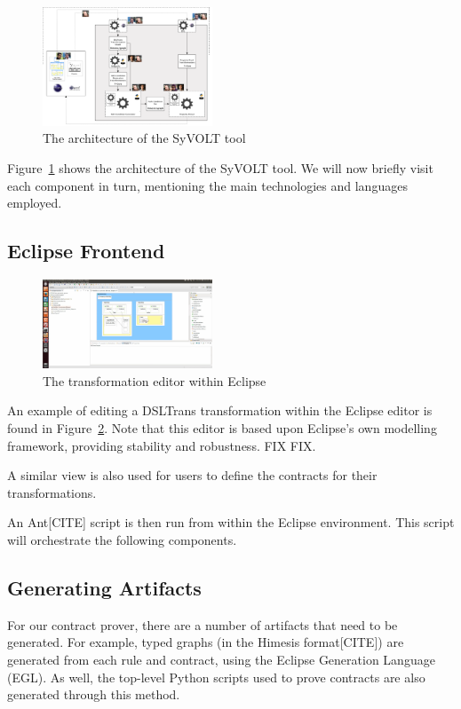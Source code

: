 \begin{figure}
\includegraphics[width=0.45\textwidth]{figures/syvolt_arch}
\caption{The architecture of the SyVOLT tool}
\label{fig:arch}
\end{figure}

Figure~\ref{fig:arch} shows the architecture of the SyVOLT tool. We will now briefly visit each component in turn, mentioning the main technologies and languages employed.

\subsection{Eclipse Frontend}
\begin{figure}
\includegraphics[width=0.45\textwidth]{figures/eclipse_frontend}
\caption{The transformation editor within Eclipse}
\label{fig:eclipse_frontend}
\end{figure}

An example of editing a DSLTrans transformation within the Eclipse editor is found in Figure~\ref{fig:eclipse_frontend}. Note that this editor is based upon Eclipse's own modelling framework, providing stability and robustness. FIX FIX.

A similar view is also used for users to define the contracts for their transformations.

An Ant[CITE] script is then run from within the Eclipse environment. This script will orchestrate the following components.


\subsection{Generating Artifacts}
For our contract prover, there are a number of artifacts that need to be generated. For example, typed graphs (in the Himesis format[CITE]) are generated from each rule and contract, using the Eclipse Generation Language (EGL). As well, the top-level Python scripts used to prove contracts are also generated through this method.

